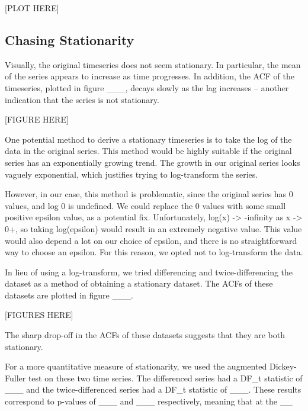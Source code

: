 \documentclass[font=12pt]{paper}
\begin{document}
[PLOT HERE]

\subsection{Chasing Stationarity}
Visually, the original timeseries does not seem stationary. In particular, the mean of the series appears to increase as time progresses. In addition, the ACF of the timeseries, plotted in figure ___, decays slowly as the lag increases -- another indication that the series is not stationary.

[FIGURE HERE]


One potential method to derive a stationary timeseries is to take the log of the data in the original series. This method would be highly suitable if the original series has an exponentially growing trend. The growth in our original series looks vaguely exponential, which justifies trying to log-transform the series.

However, in our case, this method is problematic, since the original series has 0 values, and log 0 is undefined. We could replace the 0 values with some small positive epsilon value, as a potential fix. Unfortunately, log(x) -> -infinity as x -> 0+, so taking log(epsilon) would result in an extremely negative value. This value would also depend a lot on our choice of epsilon, and there is no straightforward way to choose an epsilon. For this reason, we opted not to log-transform the data.

In lieu of using a log-transform, we tried differencing and twice-differencing the dataset as a method of obtaining a stationary dataset. The ACFs of these datasets are plotted in figure ___.

[FIGURES HERE]

The sharp drop-off in the ACFs of these datasets suggests that they are both stationary.

For a more quantitative measure of stationarity, we used the augmented Dickey-Fuller test on these two time series. The differenced series had a DF_t statistic of ___ and the twice-differenced series had a DF_t statistic of ___. These results correspond to p-values of ___ and ___ respectively, meaning that at the __%
\end{document}
